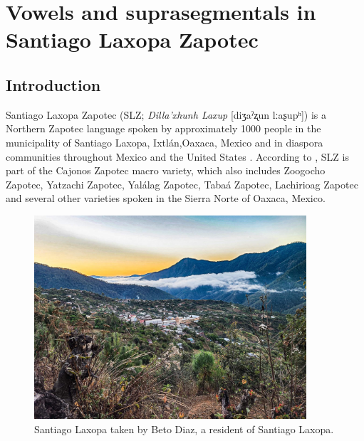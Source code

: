 %
%




\chapter{Vowels and suprasegmentals in Santiago Laxopa Zapotec} \label{ch:SLZ}

\section{Introduction} \label{sec:SLZ-intro}

Santiago Laxopa Zapotec (SLZ; \textit{Dilla'xhunh Laxup} [diʒaˀʐun lːaʂupʰ]) is a Northern Zapotec language spoken by approximately 1000 people in the municipality of Santiago Laxopa, Ixtlán,Oaxaca, Mexico and in diaspora communities throughout Mexico and the United States \citep{adlerAcousticsPhonationTypes2016,adlerDerivationVerbInitiality2018,foleyForbiddenCliticClusters2018,foleyExtendingPersonCaseConstraint2020}. 
According to \citet{smith-starkAlgunasIsoglosasZapotecas2007}, SLZ is part of the Cajonos Zapotec macro variety, which also includes Zoogocho Zapotec, Yatzachi Zapotec, Yalálag Zapotec, Tabaá Zapotec, Lachirioag Zapotec and several other varieties spoken in the Sierra Norte of Oaxaca, Mexico.

\begin{figure}[!h]
    \centering
    \includegraphics[width=0.9\textwidth]{Images/SantiagoLaxopa.jpeg}
    \caption{Santiago Laxopa taken by Beto Diaz, a resident of Santiago Laxopa.}
    \label{fig:SantiagoLaxopa}
\end{figure}



